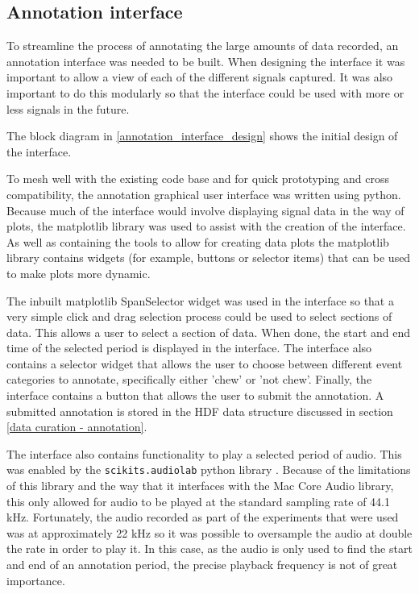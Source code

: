 
\subsection{Annotation interface}

To streamline the process of annotating the large amounts of data recorded, an annotation interface was needed to be built. When designing the interface it was important to allow a view of each of the different signals captured. It was also important to do this modularly so that the interface could be used with more or less signals in the future. 

The block diagram in \ref{annotation_interface_design} shows the initial design of the interface. 


To mesh well with the existing code base and for quick prototyping and cross compatibility, the annotation graphical user interface was written using python. Because much of the interface would involve displaying signal data in the way of plots, the matplotlib library was used to assist with the creation of the interface. As well as containing the tools to allow for creating data plots the matplotlib library contains widgets (for example, buttons or selector items) that can be used to make plots more dynamic. 

The inbuilt matplotlib SpanSelector widget was used in the interface so that a very simple click and drag selection process could be used to select sections of data. This allows a user to select a section of data. When done, the start and end time of the selected period is displayed in the interface. The interface also contains a selector widget that allows the user to choose between different event categories to annotate, specifically either 'chew' or 'not chew'. Finally, the interface contains a button that allows the user to submit the annotation. A submitted annotation is stored in the HDF data structure discussed in section \ref{data curation - annotation}. 

The interface also contains functionality to play a selected period of audio. This was enabled by the \texttt{scikits.audiolab} python library . Because of the limitations of this library and the way that it interfaces with the Mac Core Audio library, this only allowed for audio to be played at the standard sampling rate of 44.1 kHz. Fortunately, the audio recorded as part of the experiments that were used was at approximately 22 kHz so it was possible to oversample the audio at double the rate in order to play it. In this case, as the audio is only used to find the start and end of an annotation period, the precise playback frequency is not of great importance. 

